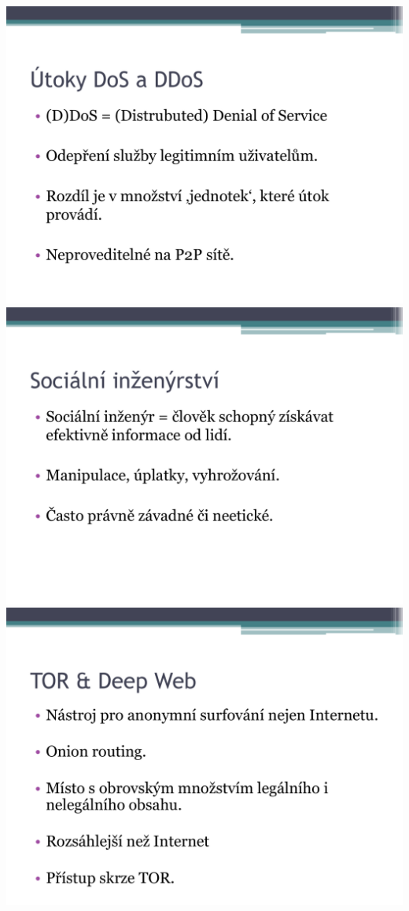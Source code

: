 \documentclass[a4paper, 12pt]{article}
\begin{document}
\includegraphics[scale=0.5]{SecurityFlythroughSlides/p03.pdf} \\
\vspace{0.5in}
\includegraphics[scale=0.5]{SecurityFlythroughSlides/p04.pdf} \\
\vspace{0.5in}
\includegraphics[scale=0.5]{SecurityFlythroughSlides/p05.pdf} \\
\end{document}
